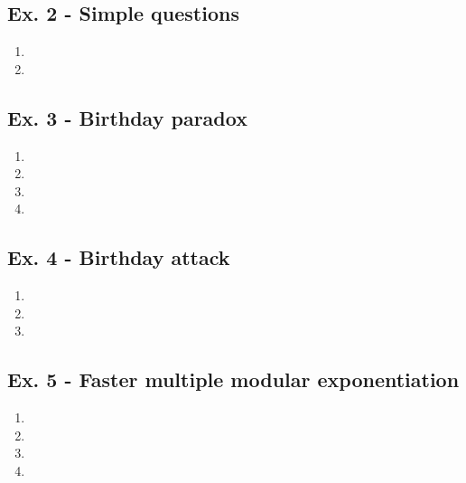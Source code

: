 \documentclass[11pt,a4paper]{article}
\begin{document}
\subsection*{Ex. 2 - Simple questions}
\begin{enumerate}
\item
\item
\end{enumerate}



\subsection*{Ex. 3 - Birthday paradox}
\begin{enumerate}
\item
\item
\item
\item
\end{enumerate}



\subsection*{Ex. 4 - Birthday attack}
\begin{enumerate}
\item
\item
\item
\end{enumerate}



\subsection*{Ex. 5 - Faster multiple modular exponentiation}
\begin{enumerate}
\item
\item
\item
\item
\end{enumerate}
\end{document}

